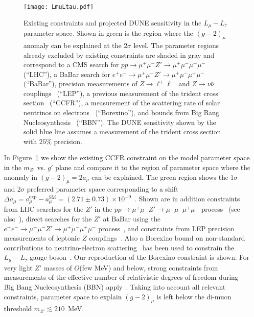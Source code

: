 \begin{figure}[tb!] \centering
\texttt{[image: LmuLtau.pdf]}
\caption[Existing constraints and projected sensitivity in the $L_\mu - L_\tau$ parameter space]{Existing constraints and projected DUNE sensitivity in the $L_\mu - L_\tau$ parameter space. Shown in green is the region where the $(g-2)_\mu$ anomaly can be explained at the $2\sigma$ level. The parameter regions already excluded by existing constraints are shaded in gray and correspond to a CMS search for $pp \to \mu^+\mu^- Z' \to \mu^+\mu^-\mu^+\mu^-$~\cite{Sirunyan:2018nnz} (``LHC''), a BaBar search for $e^+e^- \to \mu^+\mu^- Z' \to \mu^+\mu^-\mu^+\mu^-$~\cite{TheBABAR:2016rlg} (``BaBar''), precision measurements of $Z \to \ell^+ \ell^-$ and $Z \to \nu\bar\nu$ couplings~\cite{ALEPH:2005ab,Altmannshofer:2014cfa} (``LEP''), a previous measurement of the trident cross section~\cite{Mishra:1991bv,Altmannshofer:2014pba} (``CCFR''), a measurement of the scattering rate of solar neutrinos on electrons~\cite{Bellini:2011rx,Harnik:2012ni,Agostini:2017ixy} (``Borexino''), and bounds from Big Bang Nucleosynthesis~\cite{Ahlgren:2013wba,Kamada:2015era} (``BBN''). The DUNE sensitivity shown by the solid blue line assumes a measurement of the trident cross section with $25\%$ precision.}
\label{fig:LmuLtau}
\end{figure}

In Figure~\ref{fig:LmuLtau} we show the existing CCFR constraint on the model parameter space in the $m_{Z'}$ vs. $g'$ plane and compare it to the region of parameter space where the anomaly in $(g-2)_\mu = 2 a_\mu$ can be explained. The green region shows the $1\sigma$ and $2\sigma$ preferred parameter space corresponding to a shift $\Delta a_\mu = a_\mu^\text{exp}-a_\mu^\text{SM} = (2.71 \pm 0.73) \times 10^{-9}$~\cite{Keshavarzi:2018mgv}.
Shown are in addition constraints from LHC searches for the $Z'$ in the $pp \to \mu^+\mu^- Z' \to \mu^+\mu^-\mu^+\mu^-$ process~\cite{Sirunyan:2018nnz} (see also~\cite{Altmannshofer:2014pba}), direct searches for the $Z'$ at BaBar using the $e^+e^- \to \mu^+\mu^- Z' \to \mu^+\mu^-\mu^+\mu^-$ process~\cite{TheBABAR:2016rlg}, and constraints from LEP precision measurements of leptonic $Z$ couplings~\cite{ALEPH:2005ab,Altmannshofer:2014cfa}.  
Also a Borexino bound on non-standard contributions to neutrino-electron scattering~\cite{Harnik:2012ni,Bellini:2011rx,Agostini:2017ixy} has been used to constrain the $L_\mu - L_\tau$ gauge boson~\cite{Kamada:2015era,Araki:2015mya,Kamada:2018zxi}. Our reproduction of the Borexino constraint is shown.
For very light $Z'$ masses of $O$(few MeV) and below, strong constraints from measurements of the effective number of relativistic degrees of freedom during Big Bang Nucleosynthesis (BBN) apply~\cite{Ahlgren:2013wba,Kamada:2015era}.
Taking into account all relevant constraints, parameter space to explain $(g-2)_\mu$ is left below the di-muon threshold $m_{Z'} \lesssim 210$~MeV.

